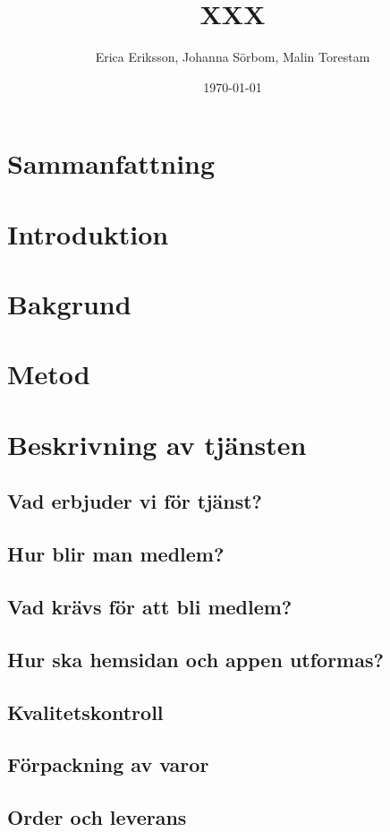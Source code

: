 \documentclass[10pt,a4paper,oneside]{article}
\title{XXX}
\author{Erica Eriksson, Johanna Sörbom, Malin Torestam}
\date{\today}
\begin{document}
\maketitle
\newpage

\section{Sammanfattning}
\newpage

\tableofcontents
\newpage

\section{Introduktion}
\newpage

\section{Bakgrund}
\newpage

\section{Metod}
\newpage

\section{Beskrivning av tjänsten}
\subsection{Vad erbjuder vi för tjänst?}
\subsection{Hur blir man medlem?}
\subsection{Vad krävs för att bli medlem?}
\subsection{Hur ska hemsidan och appen utformas?}
\subsection{Kvalitetskontroll}
\subsection{Förpackning av varor}
\subsection{Order och leverans}
\end{document}
